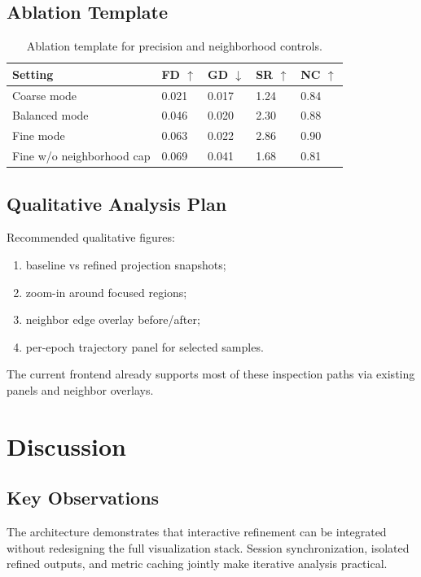 \documentclass[12pt,a4paper]{report}
\begin{document}
\section{Ablation Template}
\begin{table}[htbp]
\centering
\begin{tabular}{p{}p{}p{}p{}p{}}
\toprule
Setting & FD \(\uparrow\) & GD \(\downarrow\) & SR \(\uparrow\) & NC \(\uparrow\) \\
\midrule
Coarse mode & 0.021 & 0.017 & 1.24 & 0.84 \\
Balanced mode & 0.046 & 0.020 & 2.30 & 0.88 \\
Fine mode & 0.063 & 0.022 & 2.86 & 0.90 \\
Fine w/o neighborhood cap & 0.069 & 0.041 & 1.68 & 0.81 \\
\bottomrule
\end{tabular}
\caption{Ablation template for precision and neighborhood controls.}
\label{tab:ablation}
\end{table}

\section{Qualitative Analysis Plan}
Recommended qualitative figures:
\begin{enumerate}
\item baseline vs refined projection snapshots;
\item zoom-in around focused regions;
\item neighbor edge overlay before/after;
\item per-epoch trajectory panel for selected samples.
\end{enumerate}
The current frontend already supports most of these inspection paths via existing panels and neighbor overlays.

\chapter{Discussion}
\section{Key Observations}
The architecture demonstrates that interactive refinement can be integrated without redesigning the full visualization stack. Session synchronization, isolated refined outputs, and metric caching jointly make iterative analysis practical.
\end{document}
